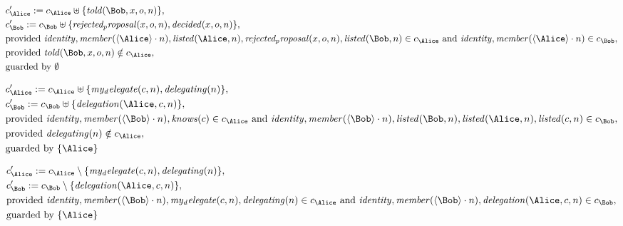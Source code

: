 \begin{align*}
&
c'_
{
\Alice
}
 := 
c_
{
\Alice
}
 \uplus 
\{
\mathit{
told
}
(
\Bob
,
x
,
o
,
n
)
\}
,\\
&
c'_
{
\Bob
}
 := 
c_
{
\Bob
}
 \uplus 
\{
\mathit{
rejected_proposal
}
(
x
,
o
,
n
)
,
\mathit{
decided
}
(
x
,
o
,
n
)
\}
,\\
&
\text{provided } 
\mathit{
identity
}
,
\mathit{
member
}
(
\langle
\Alice
\rangle
\cdot
n
)
,
\mathit{
listed
}
(
\Alice
,
n
)
,
\mathit{
rejected_proposal
}
(
x
,
o
,
n
)
,
\mathit{
listed
}
(
\Bob
,
n
)
 \in c_
{
\Alice
}
 \text{ and } 
\mathit{
identity
}
,
\mathit{
member
}
(
\langle
\Alice
\rangle
\cdot
n
)
 \in c_
{
\Bob
}
,\\
&
\text{provided } 
\mathit{
told
}
(
\Bob
,
x
,
o
,
n
)
 \notin c_
{
\Alice
}
,\\
&
\text{guarded by } \emptyset
\end{align*}

\begin{align*}
&
c'_
{
\Alice
}
 := 
c_
{
\Alice
}
 \uplus 
\{
\mathit{
my_delegate
}
(
c
,
n
)
,
\mathit{
delegating
}
(
n
)
\}
,\\
&
c'_
{
\Bob
}
 := 
c_
{
\Bob
}
 \uplus 
\{
\mathit{
delegation
}
(
\Alice
,
c
,
n
)
\}
,\\
&
\text{provided } 
\mathit{
identity
}
,
\mathit{
member
}
(
\langle
\Bob
\rangle
\cdot
n
)
,
\mathit{
knows
}
(
c
)
 \in c_
{
\Alice
}
 \text{ and } 
\mathit{
identity
}
,
\mathit{
member
}
(
\langle
\Bob
\rangle
\cdot
n
)
,
\mathit{
listed
}
(
\Bob
,
n
)
,
\mathit{
listed
}
(
\Alice
,
n
)
,
\mathit{
listed
}
(
c
,
n
)
 \in c_
{
\Bob
}
,\\
&
\text{provided } 
\mathit{
delegating
}
(
n
)
 \notin c_
{
\Alice
}
,\\
&
\text{guarded by } \{
\Alice
\}
\end{align*}

\begin{align*}
&
c'_
{
\Alice
}
 := 
c_
{
\Alice
}
 \setminus 
\{
\mathit{
my_delegate
}
(
c
,
n
)
,
\mathit{
delegating
}
(
n
)
\}
,\\
&
c'_
{
\Bob
}
 := 
c_
{
\Bob
}
 \setminus 
\{
\mathit{
delegation
}
(
\Alice
,
c
,
n
)
\}
,\\
&
\text{provided } 
\mathit{
identity
}
,
\mathit{
member
}
(
\langle
\Bob
\rangle
\cdot
n
)
,
\mathit{
my_delegate
}
(
c
,
n
)
,
\mathit{
delegating
}
(
n
)
 \in c_
{
\Alice
}
 \text{ and } 
\mathit{
identity
}
,
\mathit{
member
}
(
\langle
\Bob
\rangle
\cdot
n
)
,
\mathit{
delegation
}
(
\Alice
,
c
,
n
)
 \in c_
{
\Bob
}
,\\
&
\text{guarded by } \{
\Alice
\}
\end{align*}
